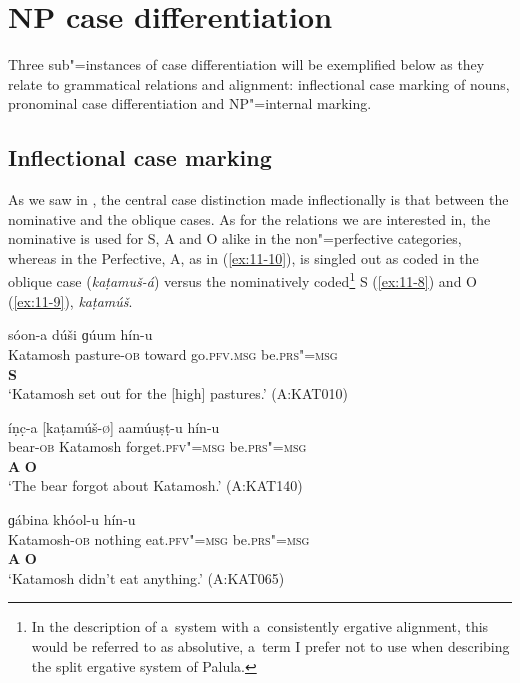 \section{NP case differentiation}
\label{sec:11-2}

Three sub"=instances of case differentiation will be exemplified below as they relate to grammatical relations and alignment: inflectional case marking of nouns, pronominal case differentiation and NP"=internal marking.


\subsection{Inflectional case marking}
\label{subsec:11-2-1}


As we saw in , the central case distinction made inflectionally is that between the nominative and the oblique cases. As for the relations we are interested in, the nominative is used for S, A and O alike in the non"=perfective categories, whereas in the Perfective, A, as in (\ref{ex:11-10}), is singled out as coded in the oblique case (\textit{kaṭamuš-á}) versus the nominatively coded\footnote{In the description of a~system with a~consistently ergative alignment, this would be referred to as absolutive, a~term I prefer not to use when describing the split ergative system of Palula.} S (\ref{ex:11-8}) and O (\ref{ex:11-9}), \textit{kaṭamúš}.

\begin{exe}
\ex
\label{ex:11-8}
 sóon-a dúši ɡúum  hín-u \\
Katamosh pasture-\textsc{ob} toward go.\textsc{pfv.msg}  be.\textsc{prs"=msg} \\
\textbf{S} \\
\glt `Katamosh set out for the [high] pastures.' (A:KAT010)

\ex
\label{ex:11-9}
\glll íṇc̣-a [kaṭamúš-\textsc{ø}] aamúuṣṭ-u hín-u \\
bear-\textsc{ob} Katamosh forget.\textsc{pfv"=msg} be.\textsc{prs"=msg} \\
 \textbf{A} \textbf{O} \\
\glt `The bear forgot about Katamosh.' (A:KAT140)

\ex
\label{ex:11-10}
\glll [kaṭamuš-á] ɡábina khóol-u hín-u \\
Katamosh-\textsc{ob} nothing eat.\textsc{pfv"=msg} be.\textsc{prs"=msg} \\
 \textbf{A} \textbf{O} \\
\glt `Katamosh didn't eat anything.' (A:KAT065)
\end{exe}


